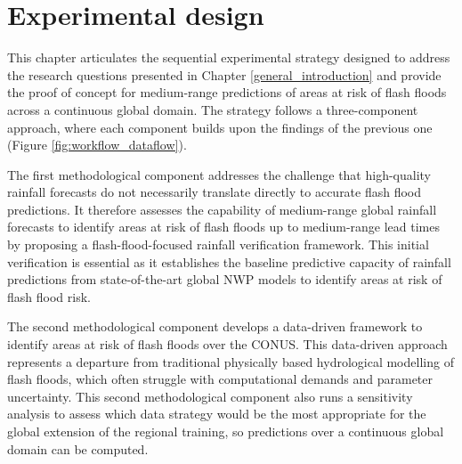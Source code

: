 \chapter{Experimental design}
\label{experimental_design}
\graphicspath{{chapter_03/figures}{chapter_03/tables}}


This chapter articulates the sequential experimental strategy designed to address the research questions presented in Chapter \ref{general_introduction} and provide the proof of concept for medium-range predictions of areas at risk of flash floods across a continuous global domain. The strategy follows a three-component approach, where each component builds upon the findings of the previous one (Figure \ref{fig:workflow_dataflow}). 

The  first methodological component addresses the challenge that high-quality rainfall forecasts do not necessarily translate directly to accurate flash flood predictions. It therefore assesses the capability of medium-range global rainfall forecasts to identify areas at risk of flash floods up to medium-range lead times by proposing a flash-flood-focused rainfall verification framework. This initial verification is essential as it establishes the baseline predictive capacity of rainfall predictions from state-of-the-art global NWP models to identify areas at risk of flash flood risk.

The  second methodological component develops a data-driven framework to identify areas at risk of flash floods over the CONUS. This data-driven approach represents a departure from traditional physically based hydrological modelling of flash floods, which often struggle with computational demands and parameter uncertainty. This second methodological component also runs a sensitivity analysis to assess which data strategy would be the most appropriate for the global extension of the regional training, so predictions over a continuous global domain can be computed.

